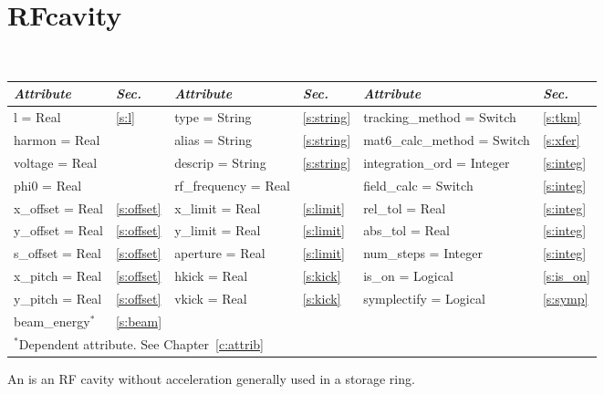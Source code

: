 {{%
\section{RFcavity}
\label{s:rfcav}

\begin{center}
\tt
\begin{tabular}{|l|l||l|l||l|l|} \hline
  {\sl Attribute} & {\sl Sec.}  & {\sl Attribute} & {\sl Sec.} & {\sl Attribute} & {\sl Sec.} \\ \hline
  l        = Real     & \ref{s:l}      & type = String      & \ref{s:string} & tracking\_method = Switch   & \ref{s:tkm}   \\ \hline
  harmon   = Real     &                & alias = String     & \ref{s:string} & mat6\_calc\_method = Switch & \ref{s:xfer}  \\ \hline
  voltage  = Real     &                & descrip = String   & \ref{s:string} & integration\_ord = Integer  & \ref{s:integ} \\ \hline
  phi0     = Real     &                & rf\_frequency = Real &              & field\_calc = Switch        & \ref{s:integ} \\ \hline
  x\_offset  = Real   & \ref{s:offset} & x\_limit = Real    & \ref{s:limit}  & rel\_tol = Real             & \ref{s:integ} \\ \hline
  y\_offset  = Real   & \ref{s:offset} & y\_limit = Real    & \ref{s:limit}  & abs\_tol = Real             & \ref{s:integ} \\ \hline
  s\_offset  = Real   & \ref{s:offset} & aperture = Real    & \ref{s:limit}  & num\_steps = Integer        & \ref{s:integ} \\ \hline
  x\_pitch = Real     & \ref{s:offset} & hkick    = Real    & \ref{s:kick}   & is\_on = Logical            & \ref{s:is_on} \\ \hline
  y\_pitch = Real     & \ref{s:offset} & vkick    = Real    & \ref{s:kick}   & symplectify = Logical       & \ref{s:symp}  \\ \hline
  beam\_energy$^*$    & \ref{s:beam}   &                    &                &                             &               \\ \hline
  \multicolumn{6}{l}{\small $^*$Dependent attribute. See Chapter~\ref{c:attrib}} \\
\end{tabular}
\end{center}
\toffset

An  is an RF cavity without acceleration generally used
in a storage ring.

}}
